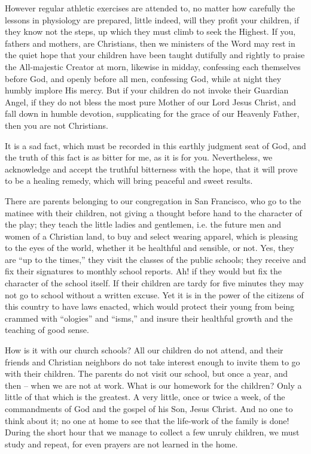 However regular athletic exercises are attended
to, no matter how carefully the lessons 
in physiology are prepared, little indeed, will 
they profit your children, if they know not the 
steps, up which they must climb to seek the 
Highest. If you, fathers and mothers, are 
Christians, then we ministers of the Word may 
rest in the quiet hope that your children have 
been taught dutifully and rightly to praise the 
All-majestic Creator at morn, likewise in midday, 
confessing each themselves before God, and 
openly before all men, confessing God, while at 
night they humbly implore His mercy. But if 
your children do not invoke their Guardian
Angel, if they do not bless the most pure 
Mother of our Lord Jesus Christ, and fall 
down in humble devotion, supplicating for the 
grace of our Heavenly Father, then you are not 
Christians. 

It is a sad fact, which must be recorded in 
this earthly judgment seat of God, and the 
truth of this fact is as bitter for me, as it is for 
you. Nevertheless, we acknowledge and accept 
the truthful bitterness with the hope, that it 
will prove to be a healing remedy, which will 
bring peaceful and sweet results. 

There are parents belonging to our congregation
in San Francisco, who go to the matinee 
with their children, not giving a thought before 
hand to the character of the play; they teach 
the little ladies and gentlemen, i.e. the future 
men and women of a Christian land, to buy and 
select wearing apparel, which is pleasing to the 
eyes of the world, whether it be healthful and 
sensible, or not. Yes, they are ``up to the 
times,'' they visit the classes of the public 
schools; they receive and fix their signatures 
to monthly school reports. Ah! if they would 
but fix the character of the school itself. If 
their children are tardy for five minutes they may 
not go to school without a written excuse. Yet 
it is in the power of the citizens of this country 
to have laws enacted, which would protect their 
young from being crammed with ``ologies'' and
``isms,'' and insure their healthful growth and 
the teaching of good sense. 

How is it with our church schools? All our 
children do not attend, and their friends and 
Christian neighbors do not take interest enough to 
invite them to go with their children. The parents
do not visit our school, but once a year, and 
then -- when we are not at work. What is our 
homework for the children? Only a little of 
that which is the greatest. A very little, once or 
twice a week, of the commandments of God and 
the gospel of his Son, Jesus Christ. And no 
one to think about it; no one at home to see 
that the life-work of the family is done! During
the short hour that we manage to collect a 
few unruly children, we must study and repeat, 
for even prayers are not learned in the home. 

